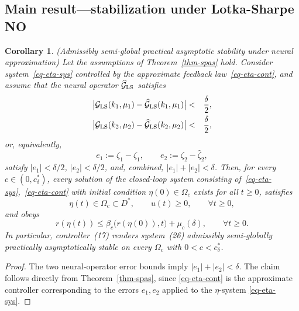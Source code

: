 \documentclass[journal,twoside,web]{ieeecolor}
\newtheorem{corollary}{Corollary}
\begin{document}
\subsection{Main result---stabilization under Lotka-Sharpe NO}

\begin{corollary}\emph{(Admissibly semi-global practical asymptotic stability under neural approximation)} %
\label{cor-main}
Let the assumptions of Theorem~\ref{thm-spas} hold. Consider system~\eqref{eq-eta-sys} controlled by the approximate feedback law~\eqref{eq-eta-cont}, and assume that the neural operator $\widehat{\mathcal{G}}_{\rm LS}$ satisfies
\begin{eqnarray}
\bigl|\mathcal{G}_{\rm LS}(k_1,\mu_1)-\widehat{\mathcal{G}}_{\rm LS}(k_1,\mu_1)\bigr|&<&\frac{\delta}{2}, \\ 
\bigl|\mathcal{G}_{\rm LS}(k_2,\mu_2)-\widehat{\mathcal{G}}_{\rm LS}(k_2,\mu_2)\bigr|&<&\frac{\delta}{2},
\end{eqnarray}
or, equivalently, 
\begin{equation}
e_1:=\zeta_1-\hat\zeta_1,\qquad e_2:=\zeta_2-\hat\zeta_2,
\end{equation}
satisfy $|e_1|<\delta/2$, $|e_2|<\delta/2$, and, combined,  $|e_1|+|e_2|<\delta$. Then, for every $c\in(0,c_\delta^*)$, every solution of the closed-loop system consisting of~\eqref{eq-eta-sys},~\eqref{eq-eta-cont} with initial condition $\eta(0)\in\Omega_c$ exists for all $t\ge 0$, satisfies
\begin{equation}
\eta(t)\in\Omega_c\subset D^*,\qquad u(t)\ge 0,\qquad \forall t\ge 0,
\end{equation}
and obeys
\begin{equation}
r(\eta(t))\le \beta_c\bigl(r(\eta(0)),t\bigr)+\mu_c(\delta),\qquad \forall t\ge 0.
\end{equation}
In particular, controller~(17) renders system~(26) admissibly semi-globally practically asymptotically stable on every $\Omega_c$ with $0<c<c_\delta^*$.
\end{corollary}

\begin{proof}
The two neural-operator error bounds imply $|e_1|+|e_2|<\delta$. The claim follows directly from Theorem~\ref{thm-spas}, since \eqref{eq-eta-cont} is the approximate controller corresponding to the errors $e_1,e_2$ applied to the $\eta$-system \eqref{eq-eta-sys}.
\end{proof}
\end{document}
